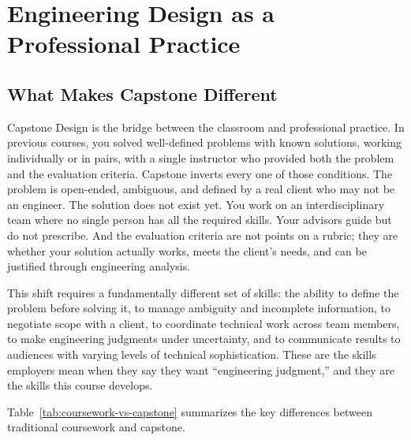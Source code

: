 \chapter{Engineering Design as a Professional Practice}

\section{What Makes Capstone Different}
Capstone Design is the bridge between the classroom and professional practice. In previous courses, you solved well-defined problems with known solutions, working individually or in pairs, with a single instructor who provided both the problem and the evaluation criteria. Capstone inverts every one of those conditions. The problem is open-ended, ambiguous, and defined by a real client who may not be an engineer. The solution does not exist yet. You work on an interdisciplinary team where no single person has all the required skills. Your advisors guide but do not prescribe. And the evaluation criteria are not points on a rubric; they are whether your solution actually works, meets the client's needs, and can be justified through engineering analysis.

This shift requires a fundamentally different set of skills: the ability to define the problem before solving it, to manage ambiguity and incomplete information, to negotiate scope with a client, to coordinate technical work across team members, to make engineering judgments under uncertainty, and to communicate results to audiences with varying levels of technical sophistication. These are the skills employers mean when they say they want ``engineering judgment,'' and they are the skills this course develops.

Table~\ref{tab:coursework-vs-capstone} summarizes the key differences between traditional coursework and capstone.

